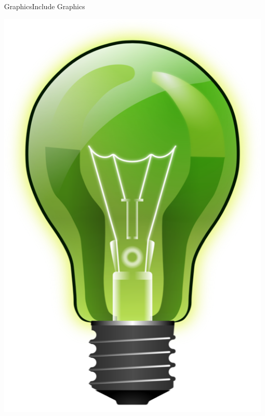 \documentclass{beamer}
\begin{document}
\begin{darkframes}
\begin{frame}[fragile]{Graphics}{Include Graphics}
\begin{center}
     \includegraphics[scale=0.2]{images/bulb}
	\end{center}
	
\end{frame}


\end{darkframes}
\end{document}
